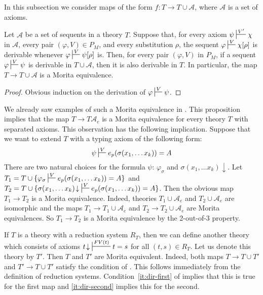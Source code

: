 \documentclass[reqno]{amsart}
\theoremstyle{definition}
\theoremstyle{remark}
\numberwithin{figure}{section}
\begin{document}
In this subsection we consider maps of the form $f : T \to T \cup \mathcal{A}$, where $\mathcal{A}$ is a set of axioms.

\begin{prop}
Let $\mathcal{A}$ be a set of sequents in a theory $T$.
Suppose that, for every axiom $\psi \sststile{}{V'} \chi$ in $\mathcal{A}$, every pair $(\varphi,V) \in P_M$, and every substitution $\rho$,
the sequent $\varphi \sststile{}{V} \chi[\rho]$ is derivable whenever $\varphi \sststile{}{V} \psi[\rho]$ is.
Then, for every pair $(\varphi,V)$ in $P_M$, if a sequent $\varphi \sststile{}{V} \psi$ is derivable in $T \cup \mathcal{A}$, then it is also derivable in $T$.
In particular, the map $T \to T \cup \mathcal{A}$ is a Morita equivalence.
\end{prop}
\begin{proof}
Obvious induction on the derivation of $\varphi \sststile{}{V} \psi$.
\end{proof}

\begin{example}
We already saw examples of such a Morita equivalence in .
This proposition implies that the map $T \to T \mathcal{A}_e$ is a Morita equivalence for every theory $T$ with separated axioms.
This observation has the following implication.
Suppose that we want to extend $T$ with a typing axiom of the following form:
\[ \psi \sststile{}{V} e_p(\sigma(x_1, \ldots x_k)) = A \]
There are two natural choices for the formula $\psi$: $\varphi_\sigma$ and $\sigma(x_1, \ldots x_k)\!\downarrow$.
Let $T_1 = T \cup \{ \varphi_\sigma \sststile{}{V} e_p(\sigma(x_1, \ldots x_k)) = A \}$ and $T_2 = T \cup \{ \sigma(x_1, \ldots x_k)\!\downarrow\ \sststile{}{V} e_p(\sigma(x_1, \ldots x_k)) = A \}$.
Then the obvious map $T_1 \to T_2$ is a Morita equivalence.
Indeed, theories $T_1 \cup \mathcal{A}_e$ and $T_2 \cup \mathcal{A}_e$ are isomorphic and the maps $T_1 \to T_1 \cup \mathcal{A}_e$ and $T_2 \to T_2 \cup \mathcal{A}_e$ are Morita equivalences.
So $T_1 \to T_2$ is a Morita equivalence by the 2-out-of-3 property.
\end{example}

\begin{example}[directed]
If $T$ is a theory with a reduction system $R_T$, then we can define another theory which consists of axioms $t\!\downarrow\ \sststile{}{FV(t)} t = s$ for all $(t,s) \in R_T$.
Let us denote this theory by $T'$.
Then $T$ and $T'$ are Morita equivalent.
Indeed, both maps $T \to T \cup T'$ and $T' \to T \cup T'$ satisfy the condition of .
This follows immediately from the definition of reduction systems.
Condition~\eqref{it:dir-first} of  implies that this is true for the first map and \eqref{it:dir-second} implies this for the second.
\end{example}
\end{document}
